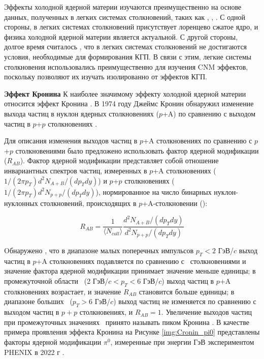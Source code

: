 Эффекты холодной ядерной материи изучаются преимущественно на основе данных, полученных в легких системах столкновений, таких как \pal, \dau, \heau. 
С одной стороны, в легких системах столкновений присутствует лоренцево сжатое ядро, и физика холодной ядерной материи является актуальной. С другой стороны, долгое время считалось \cite{PHENIX_Nature}, что в легких системах столкновений не достигаются условия, необходимые для формирования КГП. В связи с этим, легкие системы столкновения использовались преимущественно для изучения CNM эффектов, поскольку позволяют их изучать изолированно от эффектов КГП. 

\textbf{Эффект Кронина}
К наиболее значимому эффекту холодной ядерной материи относится эффект Кронина \cite{Cronin, Cronin_hadrons_pp_dAu_AuAu, Cronin2}. 
В 1974 году Джеймс Кронин обнаружил изменение выхода частиц в нуклон ядерных столкновениях ($p$+A) по сравнению с выходом частиц в $p$+$p$ столкновениях \cite{Cronin}. 

Для описания изменения выходов частиц в $p$+A столкновениях по сравнению с $p$+$p$ столкновениями было предложено использовать фактор ядерной модификации ($R_{AB}$). Фактор ядерной модификации представляет собой отношение инвариантных спектров частиц, измеренных в $p$+A столкновениях ($1/(2\pi p_T) d^2N_{A+B}/(dp_T dy)$) и $p$+$p$ столкновениях ($1/(2\pi p_T) d^2N_{p+p}/(dp_T dy)$), нормированное на число бинарных нуклон-нуклонных столкновений, происходящих в $p$+A-столкновении (\Ncoll):

$$ R_{AB} = \frac{1}{\langle N_{coll} \rangle} \frac{d^2N_{A+B}/(dp_T dy)}{d^2N_{p+p}/(dp_T dy)}$$

Oбнаружено \cite{Cronin, Cronin_hadrons_pp_dAu_AuAu, pi0_smallSysts}, что в диапазоне малых поперечных импульсов $p_T < 2$ ГэВ/$c$ выход частиц в $p$+A столкновениях подавляется по сравнению с \pp \ столкновениями и значение фактора ядерной модификации принимает значение меньше единицы; в промежуточной области \pt \ (2 ГэВ/$c < p_T < 6 $ ГэВ/$c$) выход частиц в $p$+A столкновениях возрастает, и значение $R_{AB}$ становится больше единицы; в диапазоне больших \pt \ ($p_T > 6 $ ГэВ/$c$) выход частиц не изменяется по сравнению с выходом частиц в $p+p$ столкновениях, и $R_{AB}=1$. Увеличение выходов частиц при промежуточных значениях \pt \ принято называть пиком Кронина \cite{pi0_smallSysts}. 
В качестве примера проявления эффекта Кронина на Рисунке \ref{img:Cronin_pi0} представлены факторы ядерной модификации $\pi^0$, измеренные при энергии  ГэВ экспериментом PHENIX в 2022 г \cite{pi0_smallSysts}. 

